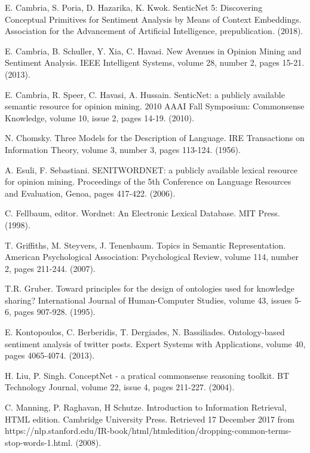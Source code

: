 \documentclass[letterpaper, 10 pt, conference]{ieeeconf}
\begin{document}
\begin{thebibliography}{99}
 E. Cambria, S. Poria, D. Hazarika, K. Kwok. SenticNet 5: Discovering Conceptual Primitives for Sentiment Analysis by Means of Context Embeddings. Association for the Advancement of Artificial Intelligence, prepublication. (2018).

 E. Cambria, B. Schuller, Y. Xia, C. Havasi. New Avenues in Opinion Mining and Sentiment Analysis. IEEE Intelligent Systems, volume 28, number 2, pages 15-21. (2013).

 E. Cambria, R. Speer, C. Havasi, A. Hussain. SenticNet: a publicly available semantic resource for opinion mining. 2010 AAAI Fall Symposium: Commonsense Knowledge, volume 10, issue 2, pages 14-19. (2010).

 N. Chomsky. Three Models for the Description of Language. IRE Transactions on Information Theory, volume 3, number 3, pages 113-124. (1956).

 A. Esuli, F. Sebastiani. SENITWORDNET: a publicly available lexical resource for opinion mining. Proceedings of the 5th Conference on Language Resources and Evaluation, Genoa, pages 417-422. (2006).

 C. Fellbaum, editor. Wordnet: An Electronic Lexical Database. MIT Press. (1998).

 T. Griffiths, M. Steyvers, J. Tenenbaum. Topics in Semantic Representation. American Psychological Association: Psychological Review, volume 114, number 2, pages 211-244. (2007).

 T.R. Gruber. Toward principles for the design of ontologies used for knowledge sharing? International Journal of Human-Computer Studies, volume 43, issues 5-6, pages 907-928. (1995).

 E. Kontopoulos, C. Berberidis, T. Dergiades, N. Bassiliades. Ontology-based sentiment analysis of twitter posts. Expert Systems with Applications, volume 40, pages 4065-4074. (2013).

 H. Liu, P. Singh. ConceptNet - a pratical commonsense reasoning toolkit. BT Technology Journal, volume 22, issue 4, pages 211-227. (2004).

 C. Manning, P. Raghavan, H Schutze. Introduction to Information Retrieval, HTML edition. Cambridge University Press. Retrieved 17 December 2017 from https://nlp.stanford.edu/IR-book/html/htmledition/dropping-common-terms-stop-words-1.html. (2008).


\end{thebibliography}
\end{document}
